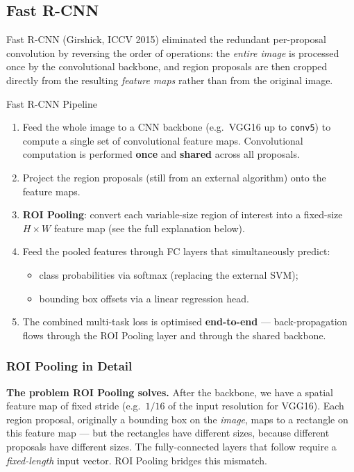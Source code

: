 \documentclass[11pt,a4paper]{article}
\begin{document}
\subsection{Fast R-CNN}
\label{sec:fast_rcnn}

Fast R-CNN (Girshick, ICCV 2015) eliminated the redundant per-proposal convolution by reversing the order of operations: the \emph{entire image} is processed once by the convolutional backbone, and region proposals are then cropped directly from the resulting \emph{feature maps} rather than from the original image.

\begin{thmbox}{Fast R-CNN Pipeline}
\begin{enumerate}
  \item Feed the whole image to a CNN backbone (e.g.\ VGG16 up to \texttt{conv5}) to compute a single set of convolutional feature maps. Convolutional computation is performed \textbf{once} and \textbf{shared} across all proposals.
  \item Project the region proposals (still from an external algorithm) onto the feature maps.
  \item \textbf{ROI Pooling}: convert each variable-size region of interest into a fixed-size
    $H \times W$ feature map (see the full explanation below).
  \item Feed the pooled features through FC layers that simultaneously predict:
    \begin{itemize}
      \item class probabilities via softmax (replacing the external SVM);
      \item bounding box offsets via a linear regression head.
    \end{itemize}
  \item The combined multi-task loss is optimised \textbf{end-to-end} — back-propagation flows through the ROI Pooling layer and through the shared backbone.
\end{enumerate}
\end{thmbox}

\subsubsection{ROI Pooling in Detail}
\label{sec:roi_pooling}

\textbf{The problem ROI Pooling solves.}  After the backbone, we have a spatial feature map of fixed
stride (e.g.\ $1/16$ of the input resolution for VGG16).  Each region proposal, originally a
bounding box on the \emph{image}, maps to a rectangle on this feature map — but the rectangles have
different sizes, because different proposals have different sizes.  The fully-connected layers that
follow require a \emph{fixed-length} input vector.  ROI Pooling bridges this mismatch.
\end{document}
